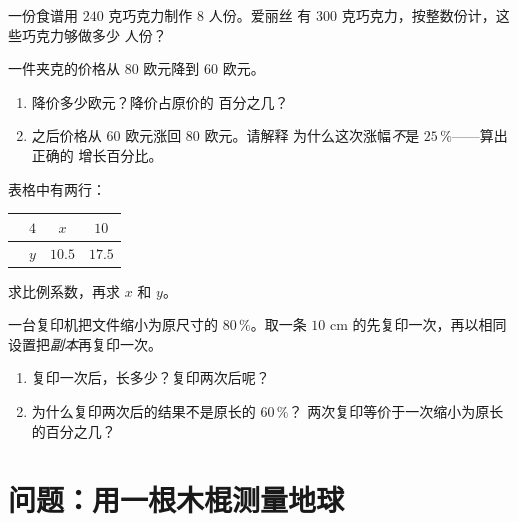 \begin{exercise}[$\star\star$]\label{exo:g7:prop:8}
一份食谱用 $240$ 克巧克力制作 $8$ 人份。爱丽丝
有 $300$ 克巧克力，按整数份计，这些巧克力够做多少
人份？
\end{exercise}

\begin{exercise}[$\star\star$]\label{exo:g7:prop:9}
一件夹克的价格从 $80$ 欧元降到 $60$ 欧元。
\begin{enumerate}
  \item 降价多少欧元？降价占原价的
        百分之几？
  \item 之后价格从 $60$ 欧元涨回 $80$ 欧元。请解释
        为什么这次涨幅\emph{不}是 $25\,\%$——算出正确的
        增长百分比。
\end{enumerate}
\end{exercise}

\begin{exercise}[$\star\star$]\label{exo:g7:prop:10}
表格中有两行：
\begin{center}
\renewcommand{\arraystretch}{1.2}
\begin{tabular}{l|ccc}
 & $4$ & $x$ & $10$ \\
\hline
 & $y$ & $10.5$ & $17.5$ \\
\end{tabular}
\end{center}
求比例系数，再求 $x$ 和 $y$。
\end{exercise}

\begin{exercise}[$\star\star\star$]\label{exo:g7:prop:11}
一台复印机把文件缩小为原尺寸的 $80\,\%$。取一条
$10$ cm 的先复印一次，再以相同
设置把\emph{副本}再复印一次。
\begin{enumerate}
  \item 复印一次后，长多少？复印两次后呢？
  \item 为什么复印两次后的结果不是原长的 $60\,\%$？
        两次复印等价于一次缩小为原长的百分之几？
\end{enumerate}
\end{exercise}

\section{问题：用一根木棍测量地球}

